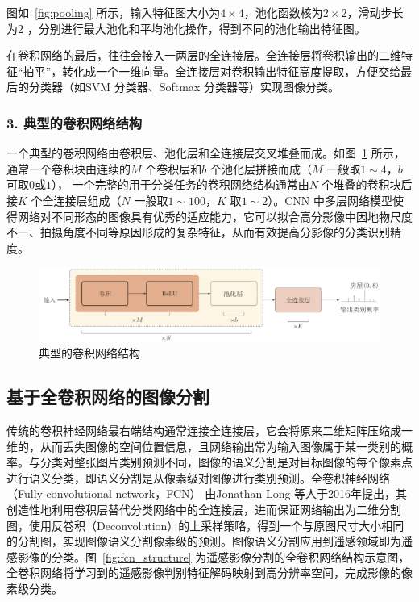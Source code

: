 图如~\ref{fig:pooling} 所示，输入特征图大小为$4 \times 4$，池化函数核为$2 \times 2$，滑动步长为$2$ ，分别进行最大池化和平均池化操作，得到不同的池化输出特征图。

在卷积网络的最后，往往会接入一两层的全连接层。全连接层将卷积输出的二维特征“拍平”，转化成一个一维向量。全连接层对卷积输出特征高度提取，方便交给最后的分类器（如SVM 分类器、Softmax 分类器等）实现图像分类。

\subsubsection*{3. 典型的卷积网络结构}
\label{subsec:chap02-2-1-3}

一个典型的卷积网络由卷积层、池化层和全连接层交叉堆叠而成。如图~\ref{fig:cnn_structure} 所示，通常一个卷积块由连续的$M$ 个卷积层和$b$ 个池化层拼接而成（$M$ 一般取$1\sim 4$，$b$ 可取$0$或$1$）， 一个完整的用于分类任务的卷积网络结构通常由$N$ 个堆叠的卷积块后接$K$ 个全连接层组成（$N$ 一般取$1\sim 100$，$K$ 取$1 \sim 2$）。CNN 中多层网络模型使得网络对不同形态的图像具有优秀的适应能力，它可以拟合高分影像中因地物尺度不一、拍摄角度不同等原因形成的复杂特征，从而有效提高分影像的分类识别精度。

\begin{figure}[htb]
  \centering
  \includegraphics[width=1.0\textwidth]{figures/cnn_structure}
  \caption{典型的卷积网络结构}\label{fig:cnn_structure}
\end{figure}

\subsection{基于全卷积网络的图像分割}
\label{subsec:chap02-2-1}
传统的卷积神经网络最右端结构通常连接全连接层，它会将原来二维矩阵压缩成一维的，从而丢失图像的空间位置信息，且网络输出常为输入图像属于某一类别的概率。与分类对整张图片类别预测不同，图像的语义分割是对目标图像的每个像素点进行语义分类，即语义分割是从像素级对图像进行类别预测。全卷积神经网络（Fully convolutional network，FCN）\cite{long2015fully} 由Jonathan Long 等人于2016年提出，其创造性地利用卷积层替代分类网络中的全连接层，进而保证网络输出为二维分割图，使用反卷积（Deconvolution）的上采样策略，得到一个与原图尺寸大小相同的分割图，实现图像语义分割像素级的预测。图像语义分割应用到遥感领域即为遥感影像的分类。图~\ref{fig:fcn_structure} 为遥感影像分割的全卷积网络结构示意图，全卷积网络将学习到的遥感影像判别特征解码映射到高分辨率空间，完成影像的像素级分类。

